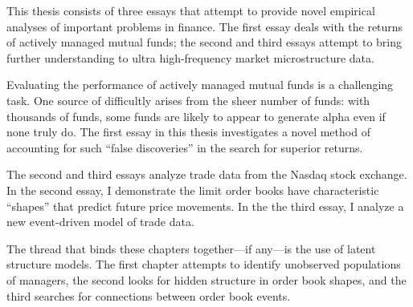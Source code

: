 This thesis consists of three essays that attempt to provide novel empirical analyses of important problems in finance. The first essay deals with the returns of actively managed mutual funds; the second and third essays attempt to bring further understanding to ultra high-frequency market microstructure data.

Evaluating the performance of actively managed mutual funds is a challenging task. One source of difficultly arises from the sheer number of funds: with thousands of funds, some funds are likely to appear to generate alpha even if none truly do. The first essay in this thesis investigates a novel method of accounting for such ``false discoveries'' in the search for superior returns.

The second and third essays analyze trade data from the Nasdaq stock exchange. In the second essay, I demonstrate the limit order books have characteristic ``shapes'' that predict future price movements. In the the third essay, I analyze a new event-driven model of trade data. 

The thread that binds these chapters together---if any---is the use of latent structure models. The first chapter attempts to identify unobserved populations of managers, the second looks for hidden structure in order book shapes, and the third searches for connections between order book events.
